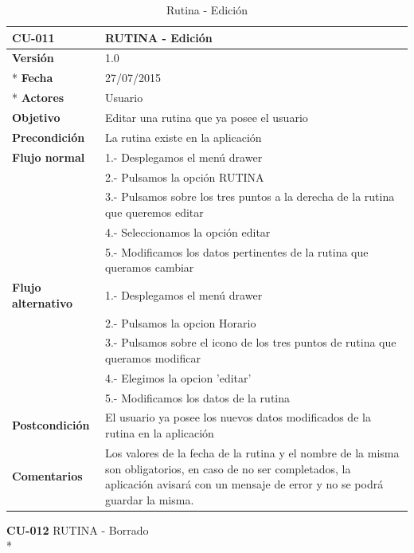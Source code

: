 \documentclass[../pfc.tex]{subfiles}
\begin{document}
		\begin{table}[H]
			\centering
			\begin{tabular}[t]{|p{3cm}|p{9.5cm}|}
				\hline \textbf{CU-011} & \textbf{RUTINA - Edición} \\*
				\hline\hline \textbf{Versión} & 1.0 \\ *
				\hline\hline \textbf{Fecha} & 27/07/2015 \\ *
				\hline\textbf{Actores} 	& Usuario\\*
				\hline \textbf{Objetivo} & Editar una rutina que ya posee el usuario\\* 			
				\hline \textbf{Precondición} & La rutina existe en la aplicación\\* 
				\hline \textbf{Flujo normal} & 1.- Desplegamos el menú drawer \\* 
				& 2.- Pulsamos la opción RUTINA\\*	
				& 3.- Pulsamos sobre los tres puntos a la derecha de la rutina que queremos editar\\*	
				& 4.- Seleccionamos la opción editar\\*	
				& 5.- Modificamos los datos pertinentes de la rutina que queramos cambiar\\*	
				\hline \textbf{Flujo alternativo} & 1.- Desplegamos el menú drawer \\* 
				& 2.- Pulsamos la opcion Horario \\*	
				& 3.- Pulsamos sobre el icono de los tres puntos de rutina que queramos modificar \\*	
				& 4.- Elegimos la opcion 'editar'\\*	
				& 5.- Modificamos los datos de la rutina\\*	
				\hline \textbf{Postcondición} & El usuario ya posee los nuevos datos modificados de la rutina en la aplicación \\* 
				\hline \textbf{Comentarios}   & Los valores de la fecha de la rutina y el nombre de la misma son obligatorios, en caso de no ser completados, la aplicación avisará con un mensaje de error y no se podrá guardar la misma.\\*
				\hline
			\end{tabular}
			\caption{Rutina - Edición}
			\label{tabla:caso011}
		\end{table}
		
	\textbf{CU-012}	RUTINA - Borrado\\*
		
\end{document}
